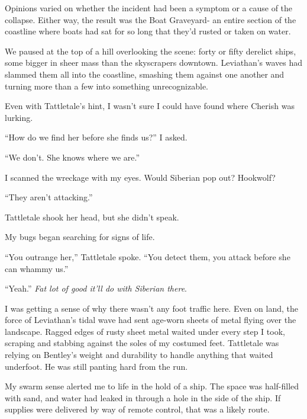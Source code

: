 Opinions varied on whether the incident had been a symptom or a cause of the collapse.  Either way, the result was the Boat Graveyard- an entire section of the coastline where boats had sat for so long that they'd rusted or taken on water.



We paused at the top of a hill overlooking the scene: forty or fifty derelict ships, some bigger in sheer mass than the skyscrapers downtown.  Leviathan's waves had slammed them all into the coastline, smashing them against one another and turning more than a few into something unrecognizable.



Even with Tattletale's hint, I wasn't sure I could have found where Cherish was lurking.



``How do we find her before she finds us?'' I asked.



``We don't.  She knows where we are.''



I scanned the wreckage with my eyes.  Would Siberian pop out?  Hookwolf?



``They aren't attacking.''



Tattletale shook her head, but she didn't speak.



My bugs began searching for signs of life.



``You outrange her,'' Tattletale spoke.  ``You detect them, you attack before she can whammy us.''



``Yeah.''  \emph{Fat lot of good it'll do with Siberian there}.



I was getting a sense of why there wasn't any foot traffic here.  Even on land, the force of Leviathan's tidal wave had sent age-worn sheets of metal flying over the landscape.  Ragged edges of rusty sheet metal waited under every step I took, scraping and stabbing against the soles of my costumed feet.  Tattletale was relying on Bentley's weight and durability to handle anything that waited underfoot.  He was still panting hard from the run.



My swarm sense alerted me to life in the hold of a ship.  The space was half-filled with sand, and water had leaked in through a hole in the side of the ship.  If supplies were delivered by way of remote control, that was a likely route.



